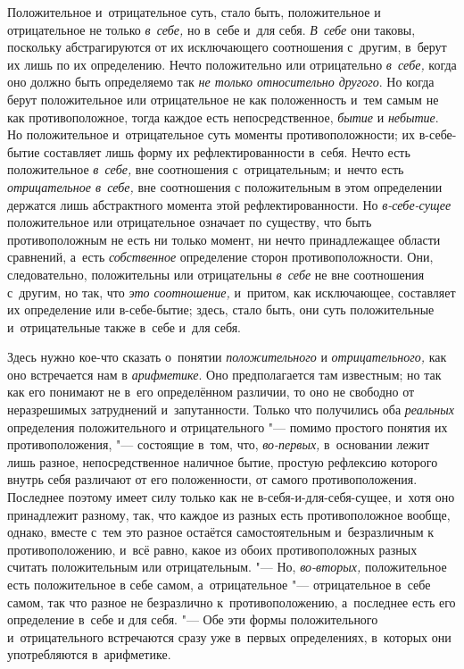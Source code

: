 Положительное и~отрицательное суть, стало быть, положительное и
отрицательное не только {\em в~себе,} но в~себе и~для
себя. {\em В~себе} они таковы, поскольку абстрагируются
от их исключающего соотношения с~другим, в~берут их лишь по их определению.
Нечто положительно или отрицательно {\em в~себе,} когда
оно должно быть определяемо так {\em не только
относительно другого}. Но когда берут положительное или отрицательное не
как положенность и~тем самым не как противоположное, тогда каждое есть
непосредственное, {\em бытие} и
{\em небытие}. Но положительное и~отрицательное суть
моменты противоположности; их в-себе-бытие составляет лишь форму их
рефлектированности в~себя. Нечто есть положительное
{\em в~себе,} вне соотношения с~отрицательным; и~нечто
есть {\em отрицательное в~себе,} вне соотношения с
положительным
в этом определении держатся лишь абстрактного момента этой
рефлектированности. Но {\em в-себе-сущее} положительное
или отрицательное означает по существу, что быть противоположным не есть ни
только момент, ни нечто принадлежащее области сравнений, а~есть
{\em собственное} определение сторон противоположности.
Они, следовательно, положительны или отрицательны
{\em в~себе} не вне соотношения с~другим, но так, что
{\em это соотношение,} и~притом, как исключающее,
составляет их определение или в-себе-бытие; здесь, стало быть, они суть
положительные и~отрицательные также в~себе и~для себя.


Здесь нужно кое-что сказать о~понятии {\em положительного} и
{\em отрицательного,} как оно встречается нам в
{\em арифметике}. Оно предполагается там известным; но
так как его понимают не в~его определённом различии, то оно не свободно от
неразрешимых затруднений и~запутанности. Только что получились оба
{\em реальных} определения положительного и
отрицательного "--- помимо простого понятия их противоположения,
"--- состоящие в~том, что, {\em во-первых,} в~основании лежит лишь
разное, непосредственное наличное бытие, простую рефлексию которого внутрь
себя различают от его положенности, от самого противоположения. Последнее
поэтому имеет силу только как не в-себя-и-для-себя-сущее, и~хотя оно
принадлежит разному, так, что каждое из разных есть противоположное вообще,
однако, вместе с~тем это разное остаётся самостоятельным и~безразличным к
противоположению, и~всё равно, какое из обоих противоположных разных
считать положительным или отрицательным. "--- Но,
{\em во-вторых,} положительное есть положительное в
себе самом, а~отрицательное "--- отрицательное в~себе самом, так что разное не
безразлично к~противоположению, а~последнее есть его определение в~себе и
для себя. "--- Обе эти формы положительного и~отрицательного встречаются сразу
уже в~первых определениях, в~которых они употребляются в~арифметике.

